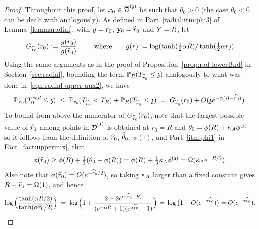 \begin{proof}
Throughout this proof, let $x_0\in\overline{\mathcal{D}}^{(\mathfrak{z})}$ be such that $\theta_0>0$ (the case $\theta_0<0$ can be dealt with analogously).
As defined in Part~\eqref{radial:itm:phi3} of Lemma~\ref{lemmaradial},  with $y=r_0$, ${\bf y}_0=\widehat{r}_0$ and $Y=R$, let
\[
G_{\widehat{r}_0}(r_0)
    := \frac{g(r_0)}{g(\widehat{r}_0)}, \qquad \text{where}\qquad g(r):=\log(\tanh(\tfrac12\alpha R)/\tanh(\tfrac12\alpha r))
\]
Using the same arguments as in the proof of Proposition~\ref{prop:rad-lowerBnd} in Section~\ref{sec:radial}, bounding the term $\mathbb{P}_{R}(T_{\widehat{r}_0}\leq\mathfrak{z})$ analogously to what was done in~\eqref{eqn:radial-upper-aux2}, we have
\begin{equation}\label{eq:bound1radmix}\mathbb{P}_{x_0}(T^{rad}_0\leq \mathfrak{z})\;\leq\;\mathbb{P}_{r_0}(T_{\widehat{r}_0}<T_R)+\mathbb{P}_{R}(T_{\widehat{r}_0}\leq\mathfrak{z}) \; = \; G_{\widehat{r}_0}(r_0)+O(\mathfrak{z} e^{-\alpha(R-\widehat{r}_0)}).
\end{equation}
To bound from above the numerator of $G_{\widehat{r}_0}(r_0)$, note that the largest possible value of $\widehat{r}_0$ among points in $\overline{\mathcal{D}}^{(\mathfrak{z})}$ is obtained at $r_0=R$ and $\theta_0=\phi(R)+\kappa_A\phi^{(\mathfrak{z})}$ so it follows from the definition of $\widehat{r}_0$, $\widehat{\theta}_0$, $\phi(\cdot)$, and Part~\eqref{itm:phi1} in Fact~\ref{fact:uppermix}, that
\[\phi(\widehat{r}_0)\ge\phi(R)+\tfrac{1}{3}(\theta_0-\phi(R))=\phi(R)+\tfrac{1}{3}\kappa_A\phi^{(\mathfrak{z})}=\Omega(\kappa_A e^{-R/2}).\]
Also note that $\phi(\widehat{r}_0)=O(e^{-\widehat{r}_0/2})$, so taking $\kappa_A$ larger than a fixed constant gives $R-\widehat{r}_0=\Omega(1)$, and hence
\[\log\Big(\frac{\tanh(\alpha R/2)}{\tanh(\alpha \widehat{r}_0/2)}\Big)\;=\;\log\Big(1+\frac{2-2e^{\alpha(\widehat{r}_0-R)}}{(e^{-\alpha R}+1)(e^{\alpha \widehat{r}_0}-1)}\Big)\,=\,\log\big(1+O(e^{-\alpha\widehat{r}_0})\big)=O(e^{-\alpha\widehat{r}_0}).\]

\end{proof}
